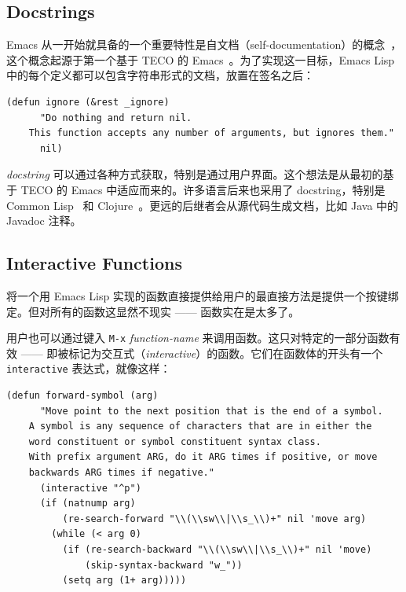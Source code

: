 \documentclass[format=acmsmall,screen]{acmart}
\begin{document}
\subsection{Docstrings}
\label{sec:docstrings}

Emacs 从一开始就具备的一个重要特性是自文档（self-documentation）的概念~\cite{Stallman1981}，这个概念起源于第一个基于 TECO 的 Emacs~\cite{Stallman2018-personal}。为了实现这一目标，Emacs Lisp 中的每个定义都可以包含字符串形式的文档，放置在签名之后：
\begin{Verbatim}[samepage=true]
    (defun ignore (&rest _ignore)
      "Do nothing and return nil.
    This function accepts any number of arguments, but ignores them."
      nil)
\end{Verbatim}
\emph{docstring} 可以通过各种方式获取，特别是通过用户界面。这个想法是从最初的基于 TECO 的 Emacs 中适应而来的。许多语言后来也采用了 docstring，特别是 Common Lisp~\cite{HyperSpec} 和 Clojure~\cite{ClojureDotOrg}。更远的后继者会从源代码生成文档，比如 Java 中的 Javadoc 注释。

\subsection{Interactive Functions}
\label{sec:interactive-functions}

将一个用 Emacs Lisp 实现的函数直接提供给用户的最直接方法是提供一个按键绑定。但对所有的函数这显然不现实 —— 函数实在是太多了。

用户也可以通过键入 \texttt{M-x} \emph{function-name} 来调用函数。这只对特定的一部分函数有效 —— 即被标记为交互式（\emph{interactive}）的函数。它们在函数体的开头有一个 \texttt{interactive} 表达式，就像这样：
\begin{Verbatim}[samepage=true]
    (defun forward-symbol (arg)
      "Move point to the next position that is the end of a symbol.
    A symbol is any sequence of characters that are in either the
    word constituent or symbol constituent syntax class.
    With prefix argument ARG, do it ARG times if positive, or move
    backwards ARG times if negative."
      (interactive "^p")
      (if (natnump arg)
          (re-search-forward "\\(\\sw\\|\\s_\\)+" nil 'move arg)
        (while (< arg 0)
          (if (re-search-backward "\\(\\sw\\|\\s_\\)+" nil 'move)
              (skip-syntax-backward "w_"))
          (setq arg (1+ arg)))))
\end{Verbatim}
\end{document}
